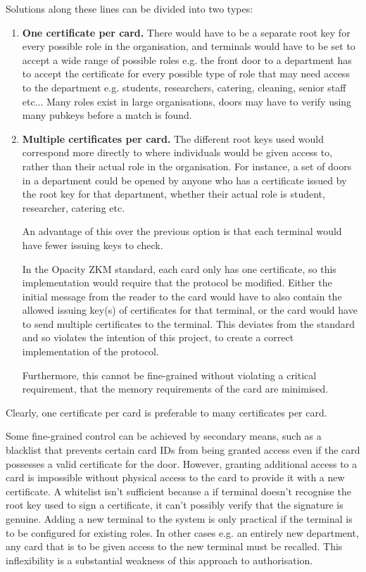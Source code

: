 \documentclass[12pt]{article}
\begin{document}
Solutions along these lines can be divided into two types: 
\begin{enumerate}
	\item \textbf{One certificate per card.} There would have to be a separate root key for every possible role in the organisation, and terminals would have to be set to accept a wide range of possible roles e.g. the front door to a department has to accept the certificate for every possible type of role that may need access to the department e.g. students, researchers, catering, cleaning, senior staff etc... Many roles exist in large organisations, doors may have to verify using many pubkeys before a match is found.
	
	\item \textbf{Multiple certificates per card.} The different root keys used would correspond more directly to where individuals would be given access to, rather than their actual role in the organisation. For instance, a set of doors in a department could be opened by anyone who has a certificate issued by the root key for that department, whether their actual role is student, researcher, catering etc.
	
	An advantage of this over the previous option is that each terminal would have fewer issuing keys to check.
	
	In the Opacity ZKM standard, each card only has one certificate, so this implementation would require that the protocol be modified. Either the initial message from the reader to the card would have to also contain the allowed issuing key(s) of certificates for that terminal, or the card would have to send multiple certificates to the terminal. This deviates from the standard and so violates the intention of this project, to create a correct implementation of the protocol.
	
	Furthermore, this cannot be fine-grained without violating a critical requirement, that the memory requirements of the card are minimised.
\end{enumerate}

Clearly, one certificate per card is preferable to many certificates per card. 

Some fine-grained control can be achieved by secondary means, such as a blacklist that prevents certain card IDs from being granted access even if the card possesses a valid certificate for the door. However, granting additional access to a card is impossible without physical access to the card to provide it with a new certificate. A whitelist isn't sufficient because a if terminal doesn't recognise the root key used to sign a certificate, it can't possibly verify that the signature is genuine. Adding a new terminal to the system is only practical if the terminal is to be configured for existing roles. In other cases e.g. an entirely new department, any card that is to be given access to the new terminal must be recalled. This inflexibility is a substantial weakness of this approach to authorisation.
\end{document}
